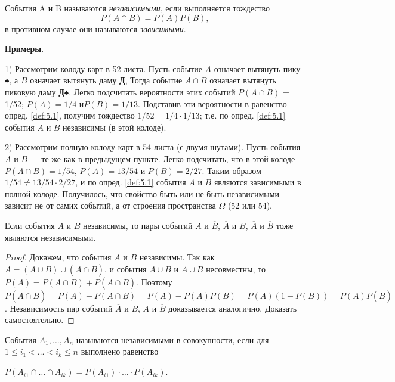 
\begin{definition} 
\label{def:5.1}
События A и B называются \textit{независимыми}, если выполняется тождество
\begin{equation*}
	P(A \cap B) = P(A)P(B),
\end{equation*}
в противном случае они называются \textit{зависимыми}.
\end{definition}
	
\textbf{Примеры}. 

1) Рассмотрим колоду карт в 52 листа. 
Пусть событие $A$ означает вытянуть пику ♠, а $B$ означает вытянуть даму \textbf{Д}, Тогда событие $A\cap B$ означает вытянуть пиковую даму \textbf{Д♠}. Легко подсчитать вероятности этих событий $P(A\cap B)$ = 1/52; $P(A) = 1/4$ и$ P(B) = 1/13$. Подставив эти вероятности в равенство опред. \ref{def:5.1}, получим тождество $1/52 = 1/4 \cdot1/13$; т.е. по опред. \ref{def:5.1} события $A$ и $ B $ независимы (в этой колоде).


2) Рассмотрим полную колоду карт в 54 листа (с двумя шутами). 
Пусть события $A$ и $B$ — те же как в предыдущем пункте. 
Легко подсчитать, что в этой колоде $P(A \cap B) = 1/54$, $P(A) = 13/54$ и $P(B) = 2/27$. 
Таким образом $1/54 \neq 13/54 \cdot 2/27$, и по опред. \ref{def:5.1} события $A$ и $B$ являются зависимыми в полной колоде. 
Получилось, что свойство быть или не быть независимыми зависит не от самих событий, а от строения пространства $\Omega$ (52 или 54).

\begin{lemma}
Если события $A$ и $B$ независимы, то пары событий $A$ и $\overline{B}$, $\overline{A}$ и $B$, $\overline{A}$ и $\overline{B}$ тоже являются независимыми.
\end{lemma}
\begin{proof}
 Докажем, что события $A$ и $\overline{B}$ независимы. Так как 
 $A =(A \cup B)\cup(A \cap \overline{B})$, и события $A\cup B$ и $A\cup \overline{B}$ несовместны, то  $P(A) = P(A\cap B)+P(A\cap\overline{B})$. 
Поэтому $P(A \cap  \overline{B}) = P(A) − P(A \cap  B) = P(A) − P(A)P(B) =
P(A)(1 − P(B)) = P(A)P(\overline{B})$.
Независимость пар событий $\overline{A}$ и $B$, $A$ и $\overline{B}$ доказывается аналогично. Доказать самостоятельно.
\end{proof}

\begin{definition}
События $A_1,\dots,A_n$ называются независимыми в совокупности, если для $1 \leqslant i_1 < \dots < i_k \leqslant n$ выполнено равенство

$P(A_{i1}\cap \dots \cap  A_{ik}) = P(A_{i1}) \cdot\dots\cdot P(A_{ik})$.
\end{definition}

